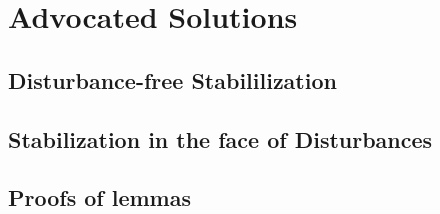\documentclass[a4paper,11pt,twoside]{book}
\begin{document}
\part{Advocated Solutions}
\label{part:advocated_solutions}
    \cleardoublepage

  \chapter{Disturbance-free Stabililization}
    \label{sec:stabilization_without_disturbance}

    
    
    
    
    \cleardoublepage

  \chapter{Stabilization in the face of Disturbances}
    \label{sec:stabilization_with_disturbance}

    
    
    
    
    \cleardoublepage

\begin{appendices}

  \chapter{Proofs of lemmas}
    \label{chapter:proofs_of_lemmas}

    
    
    
    
    
    \cleardoublepage
\end{appendices}




\end{document}
